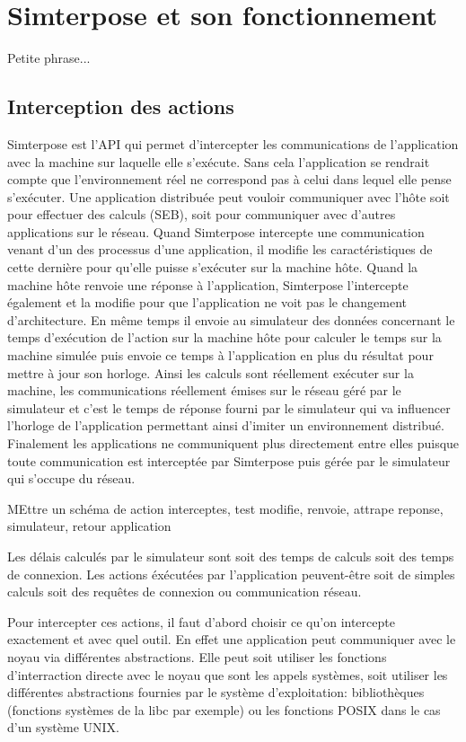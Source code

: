 \section{Simterpose et son fonctionnement}
Petite phrase...
\subsection{Interception des actions}
Simterpose est l'API qui permet d'intercepter les communications de
l'application avec la machine sur laquelle elle s'exécute. Sans cela
l'application se rendrait compte que l'environnement réel ne correspond pas à
celui dans lequel elle pense s'exécuter. Une application distribuée peut vouloir
communiquer avec l'hôte soit pour effectuer des calculs (SEB), soit pour
communiquer avec d'autres applications sur le réseau. Quand Simterpose
intercepte une communication venant d'un des processus d'une application, il
modifie les caractéristiques de cette dernière pour qu'elle puisse s'exécuter
sur la machine hôte. Quand la machine hôte renvoie une réponse à l'application,
Simterpose l'intercepte également et la modifie pour que l'application ne voit
pas le changement d'architecture. En même temps il envoie au simulateur des
données concernant le temps d'exécution de l'action sur la machine hôte pour
calculer le temps sur la machine simulée puis envoie ce temps à l'application en
plus du résultat pour mettre à jour son horloge. Ainsi les calculs sont
réellement exécuter sur la machine, les communications réellement émises sur le
réseau géré par le simulateur et c'est le temps de réponse fourni par le
simulateur qui va influencer l'horloge de l'application permettant ainsi
d'imiter un environnement distribué. Finalement les applications ne communiquent
plus directement entre elles puisque toute communication est interceptée par
Simterpose puis gérée par le simulateur qui s'occupe du réseau.

{\color{red} MEttre un schéma de action interceptes, test modifie, renvoie,
  attrape reponse, simulateur, retour application}

Les délais calculés par le simulateur sont soit des temps de calculs soit des
temps de connexion. Les actions éxécutées par l'application peuvent-être soit
de simples calculs soit des requêtes de connexion ou communication réseau.

Pour intercepter ces actions, il faut d'abord choisir ce qu'on intercepte
exactement et avec quel outil. En effet une application peut communiquer avec le
noyau via différentes abstractions. Elle peut soit utiliser les fonctions
d'interraction directe avec le noyau que sont les appels systèmes, soit utiliser
les différentes abstractions fournies par le système d'exploitation:
bibliothèques (fonctions systèmes de la libc par exemple) ou les fonctions POSIX
dans le cas d'un système UNIX.

